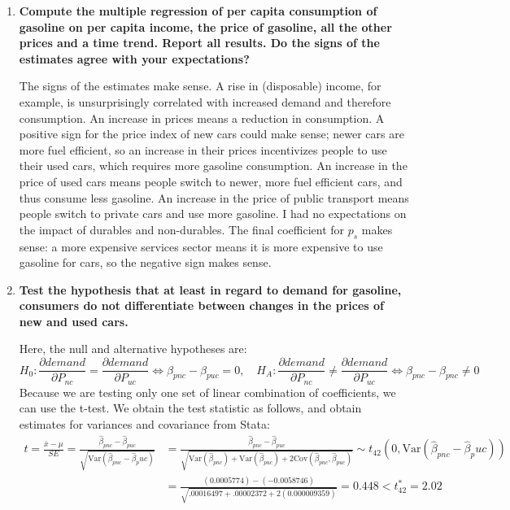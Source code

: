 \documentclass{article}
\begin{document}
\begin{enumerate}[label=\alph*.]
\item \textbf{Compute the multiple regression of per capita consumption of gasoline on per capita income, the price of gasoline, all the other prices and a time trend. Report all results. Do the signs of the estimates agree with your expectations?}


The signs of the estimates make sense. A rise in (disposable) income, for example, is unsurprisingly correlated with increased demand and therefore consumption. An increase in prices means a reduction in consumption. A positive sign for the price index of new cars could make sense; newer cars are more fuel efficient, so an increase in their prices incentivizes people to use their used cars, which requires more gasoline consumption. An increase in the price of used cars means people switch to newer, more fuel efficient cars, and thus consume less gasoline. An increase in the price of public transport means people switch to private cars and use more gasoline. I had no expectations on the impact of durables and non-durables. The final coefficient for $p_s$ makes sense: a more expensive services sector means it is more expensive to use gasoline for cars, so the negative sign makes sense.
\item \textbf{Test the hypothesis that at least in regard to demand for gasoline, consumers do not differentiate between changes in the prices of new and used cars.}

Here, the null and alternative hypotheses are:
$$ H_0:\frac{\partial demand}{\partial P_{nc}}=\frac{\partial demand}{\partial P_{uc}} \iff \beta_{pnc} - \beta_{puc} =0, \quad H_A: \frac{\partial demand}{\partial P_{nc}} \neq \frac{\partial demand}{\partial P_{uc}} \iff \beta_{pnc} - \beta_{pnc} \neq 0$$
Because we are testing only one set of linear combination of coefficients, we can use the t-test. We obtain the test statistic as follows, and obtain estimates for variances and covariance from Stata:
\begin{align*}
t = \frac{\bar{x}-\mu}{SE} =  \frac{\hat{\beta}_{pnc}-  \hat{\beta}_{puc}}{\sqrt{{\text{Var}}(\hat{\beta}_{pnc} - \hat{\beta}_puc)}} & = \frac{\hat{\beta}_{pnc} - \hat{\beta}_{puc}}{\sqrt{ {\text{Var}(\hat{\beta}_{pnc})}  + {\text{Var}(\hat{\beta}_{puc})} + 2 { \text{Cov}(\hat{\beta}_{pnc}, \hat{\beta}_{puc})  }  }    } \sim t_{42}(0, {\text{Var}(\hat{\beta}_{pnc} - \hat{\beta}_puc)})  \\
& = \frac{(0.0005774) - (-0.0058746)}{\sqrt{.00016497 + .00002372 + 2(0.000009359)}} = 0.448 < t_{42}^{*} = 2.02
\end{align*}
	

\end{enumerate}
\end{document}
